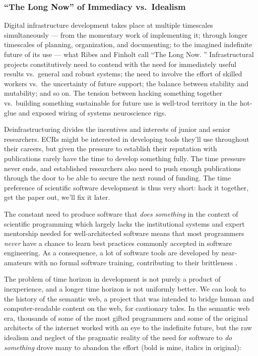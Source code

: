 \documentclass[10pt]{article}
\begin{document}
\begin{multicols}{2}
\hypertarget{the-long-now-of-immediacy-vs.-idealism}{%
\subsubsection{``The Long Now'' of Immediacy
vs.~Idealism}\label{the-long-now-of-immediacy-vs.-idealism}}

Digital infrastructure development takes place at multiple timescales
simultaneously --- from the momentary work of implementing it; through
longer timescales of planning, organization, and documenting; to the
imagined indefinite future of its use --- what Ribes and Finholt call
``The Long Now. \cite{ribesLongNowTechnology2009} ''
Infrastructural projects constitutively need to contend with the need
for immediately useful results vs.~general and robust systems; the need
to involve the effort of skilled workers vs.~the uncertainty of future
support; the balance between stability and mutability; and so on. The
tension between hacking something together vs.~building something
sustainable for future use is well-trod territory in the hot-glue and
exposed wiring of systems neuroscience rigs.

Deinfrastructuring divides the incentives and interests of junior and
senior researchers. ECRs might be interested in developing tools they'll
use throughout their careers, but given the pressure to establish their
reputation with publications rarely have the time to develop something
fully. The time pressure never ends, and established researchers also
need to push enough publications through the door to be able to secure
the next round of funding. The time preference of scientific software
development is thus very short: hack it together, get the paper out,
we'll fix it later.

The constant need to produce software that \emph{does something} in the
context of scientific programming which largely lacks the institutional
systems and expert mentorship needed for well-architected software means
that most programmers \emph{never} have a chance to learn best practices
commonly accepted in software engineering. As a consequence, a lot of
software tools are developed by near-amateurs with no formal software
training, contributing to their brittleness \cite{altschulAnatomySuccessfulComputational2013} .

The problem of time horizon in development is not purely a product of
inexperience, and a longer time horizon is not uniformly better. We can
look to the history of the semantic web, a project that was intended to
bridge human and computer-readable content on the web, for cautionary
tales. In the semantic web era, thousands of some of the most gifted
programmers and some of the original architects of the internet worked
with an eye to the indefinite future, but the raw idealism and neglect
of the pragmatic reality of the need for software to \emph{do something}
drove many to abandon the effort (bold is mine, italics in original):


\end{multicols}
\end{document}

